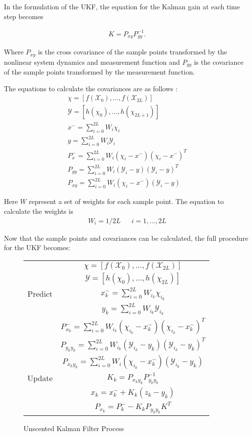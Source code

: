 In the formulation of the UKF, the equation for the Kalman gain at each time step becomes \cite{ukf_merwe}

\begin{align}
K = P_{xy}P^{-1}_{yy}.
\end{align}

Where $P_{xy}$ is the cross covariance of the sample points transformed by the nonlinear system dynamics and measurement function and $P_{yy}$ is the covariance of the sample points transformed by the measurement function.

The equations to calculate the covariances are as follows \cite{ukf_merwe}:
\begin{align}
\chi = [f(\mathcal{X}_0),...,f(\mathcal{X}_{2L})]\\
\mathcal{Y} = [h(\chi_0),...,h(\chi_{2L+1})]\\
x^- = \sum_{i=0}^{2L}W_i\chi_i\\
y = \sum_{i=0}^{2L}W_i\mathcal{Y}_i\\
P^-_x = \sum_{i=0}^{2L}W_i(\chi_i - x^-)(\chi_i - x^-)^T\\
P_{yy} = \sum_{i=0}^{2L}W_i(\mathcal{Y}_i - y)(\mathcal{Y}_i - y)^T \\
P_{xy} = \sum_{i=0}^{2L}W_i(\chi_i - x^-)(\mathcal{Y}_i - y)
\end{align}

Here $W$ represent a set of weights for each sample point. The equation to calculate the weights is \cite{Julier_sigma}
\begin{align}
W_i = 1/2L && i = 1,...,2L
\end{align}

Now that the sample points and covariances can be calculated, the full procedure for the UKF becomes:

\begin{figure}
\begin{center}
	\begin{tabular}{| c | c|} 
		\hline
		\space & $\chi = [f(\mathcal{X}_0),...,f(\mathcal{X}_{2L})]$\\
		\space & $\mathcal{Y} = [h(\chi_0),...,h(\chi_{2L})]$\\
		Predict & $x^-_k = \sum_{i=0}^{2L}W_{i_k}\chi_{i_k}$\\
		\space & $y_k = \sum_{i=0}^{2L}W_{i_k}\mathcal{Y}_{i_k}$\\
		\space & $P^-_{x_k} = \sum_{i=0}^{2L}W_{i_k}(\chi_{i_k} - x^-_k)(\chi_{i_k} - x^-_k)^T$\\ 
		\hline
		\space & $P_{y_ky_k} = \sum_{i=0}^{2L}W_{i_k}(\mathcal{Y}_{i_k} - y_k)(\mathcal{Y}_{i_k} - y_k)^T$ \\
		\space & $P_{x_ky_k} = \sum_{i=0}^{2L}W_i(\chi_{i_k} - x^-_k)(\mathcal{Y}_{i_k} - y_k)$\\
		Update & $K_{k} = P_{x_ky_k}P^{-1}_{y_ky_k}$ \\
		\space & $x_{k} = x^-_{k} + K_k(z_k - y_k)$ \\
		\space & $P_{x_k} = P^-_k - K_kP_{y_ky_k}K^T$\\
		\hline
	\end{tabular}
\end{center}
\caption{Unscented Kalman Filter Process}
\end{figure}

